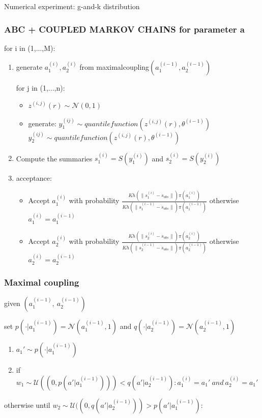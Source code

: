 \documentclass{beamer}
\begin{document}
\begin{section}{Numerical experiment: g-and-k distribution}
\begin{frame}
\end{frame}
\begin{frame}
	\frametitle{ABC + COUPLED MARKOV CHAINS for parameter a}
	for i in (1,...,M):
	\begin{enumerate}
		\item 	generate $a_{1}^{(i)},a_{2}^{(i)}$  from maximalcoupling$(a_{1}^{(i-1)},a_{2}^{(i-1)})$
		
		\begin{block}
			
			for j in (1,...,n):
			\begin{itemize}
				\item $z^{(i,j)}(r) \sim \mathcal{N}(0,1)$
				\item generate:
				$ y_{1}^{(ij)} \sim quantile function(z^{(i,j)}(r), \theta^{(i-1)})$
				$ y_{2}^{(ij)} \sim quantile function(z^{(i,j)}(r), \theta^{(i-1)})$
				
			\end{itemize}
		\end{block}
		\item Compute the summaries  $ s_{1}^{(i)} =S(y_{1}^{(i)})$ and $ s_{2}^{(i)} =S(y_{2}^{(i)})$
		
		
		\item acceptance:
		\begin{itemize}
			\item Accept $a_{1}^{(i)}$ with probability $\frac{Kh(\|s_{1}^{(i)}-s_{obs}\|)\pi(a_{1}^{(i)})}{Kh(\|s_{1}^{(i-1)}- s_{obs}\|)\pi(a_{1}^{(i-1)})} $   otherwise $a_{1}^{(i)}=a_{1}^{(i-1)}$
			
			\item Accept $a_{2}^{(i)}$ with probability $\frac{Kh(\|s_{2}^{(i)}-s_{obs}\|)\pi(a_{2}^{(i)})}{Kh(\|s_{2}^{(i-1)}-s_{obs}\|)\pi(a_{2}^{(i-1)})} $  otherwise $  a_{2}^{(i)}=a_{2}^{(i-1)}$
		\end{itemize}
	\end{enumerate}
\end{frame}

\begin{frame}
	\frametitle{Maximal coupling}
	given  $(a_{1}^{(i-1)}, \ a_{2}^{(i-1)})$
	
	set	$p( \cdot |a_{1}^{(i-1)})= \mathcal{N}(a_{1}^{(i-1)},1)$ and $q( \cdot |a_{2}^{(i-1)})= \mathcal{N}(a_{2}^{(i-1)},1)$
	\begin{enumerate}
		\item $ a_{1}' \sim p( \cdot |a_{1}^{(i-1)} ) $
		
		\item if $ w_{1}\sim \mathcal{U}((0, p(a'|a_{1}^{(i-1)}))) < q(a'|a_{2}^{(i-1)} ): a_{1}^{(i)}=a_{1}' \ and \ a_{2}^{(i)}= a_{1}'$
	\end{enumerate}
	otherwise until $ w_{2}\sim \mathcal{U}((0, q(a'|a_{2}^{(i-1)})) > p(a'|a_{1}^{(i-1)} )$:
	

\end{frame}
\end{section}
\end{document}
